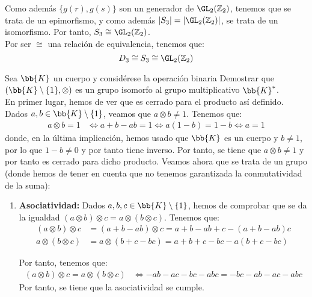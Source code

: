 \begin{ejercicio}
    Como además $\{g(r),g(s)\}$ son un generador de $\GL_2(\mathbb{Z}_2)$, tenemos que se trata de un epimorfismo, y como además $|S_3|=|\GL_2(\mathbb{Z}_2)|$, se trata de un isomorfismo. Por tanto, $S_3\cong \GL_2(\mathbb{Z}_2)$.\\

    Por ser $\cong$ una relación de equivalencia, tenemos que:
    \begin{equation*}
        D_3\cong S_3\cong \GL_2(\mathbb{Z}_2)
    \end{equation*}
\end{ejercicio}

\begin{ejercicio}\label{ej:2.29}
    Sea $\bb{K}$ un cuerpo y considérese la operación binaria
    Demostrar que $(\bb{K}\setminus \{1\}, \otimes)$ es un grupo isomorfo al grupo multiplicativo $\bb{K}^{\ast}$.\\

    En primer lugar, hemos de ver que es cerrado para el producto así definido. Dados $a,b\in \bb{K}\setminus \{1\}$, veamos que $a\otimes b\neq 1$. Tenemos que:
    \begin{align*}
        a\otimes b=1 &\iff a+b-ab=1\iff a(1-b)=1-b\iff a=1
    \end{align*} 
    donde, en la última implicación, hemos usado que $\bb{K}$ es un cuerpo y $b\neq 1$, por lo que $1-b\neq 0$ y por tanto tiene inverso. Por tanto, se tiene que $a\otimes b\neq 1$ y por tanto es cerrado para dicho producto. Veamos ahora que se trata de un grupo (donde hemos de tener en cuenta que no tenemos garantizada la conmutatividad de la suma):
    \begin{enumerate}
        \item \textbf{Asociatividad:} Dados $a,b,c\in \bb{K}\setminus \{1\}$, hemos de comprobar que se da la igualdad $(a\otimes b)\otimes c=a\otimes(b\otimes c)$. Tenemos que:
        \begin{align*}
            (a\otimes b)\otimes c &= (a+b-ab)\otimes c = a+b-ab+c-(a+b-ab)c\\
            a\otimes(b\otimes c) &= a\otimes(b+c-bc) = a+b+c-bc-a(b+c-bc)
        \end{align*}

        Por tanto, tenemos que:
        \begin{align*}
            (a\otimes b)\otimes c = a\otimes(b\otimes c) &\iff -ab -ac -bc -abc = -bc -ab -ac - abc
        \end{align*}
        Por tanto, se tiene que la asociatividad se cumple.


\end{enumerate}
\end{ejercicio}
